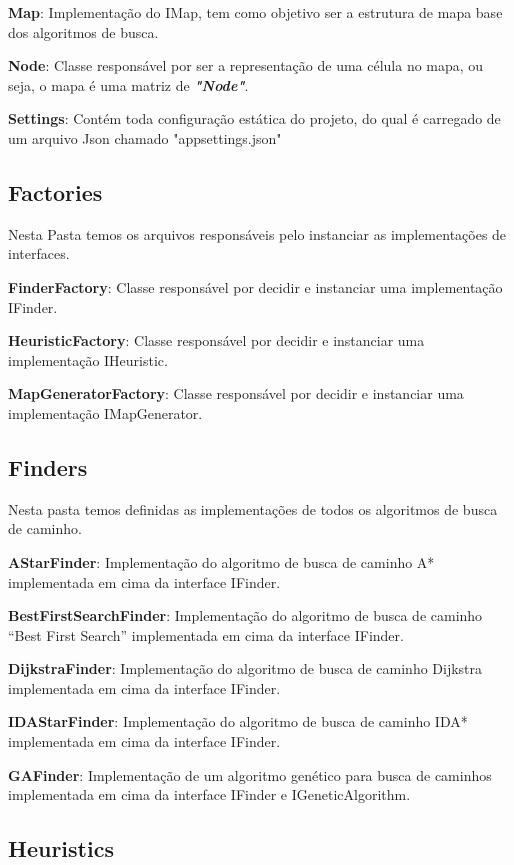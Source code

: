 \textbf{Map}: Implementação do IMap, tem como objetivo ser a estrutura de mapa base dos algoritmos de busca.

\textbf{Node}: Classe responsável por ser a representação de uma célula no mapa, ou seja, o mapa é uma matriz de \textbf{\textit{"Node"}}.

\textbf{Settings}: Contém toda configuração estática do projeto, do qual é carregado de um arquivo Json chamado "appsettings.json"

\subsection{Factories}

Nesta Pasta temos os arquivos responsáveis pelo instanciar as implementações de interfaces.

\textbf{FinderFactory}: Classe responsável por decidir e instanciar uma implementação IFinder.

\textbf{HeuristicFactory}: Classe responsável por decidir e instanciar uma implementação IHeuristic.

\textbf{MapGeneratorFactory}: Classe responsável por decidir e instanciar uma implementação IMapGenerator.

\subsection{Finders}

Nesta pasta temos definidas as implementações de todos os algoritmos de busca de caminho.

\textbf{AStarFinder}: Implementação do algoritmo de busca de caminho A* implementada em cima da interface IFinder.

\textbf{BestFirstSearchFinder}: Implementação do algoritmo de busca de caminho “Best First Search” implementada em cima da interface IFinder.

\textbf{DijkstraFinder}: Implementação do algoritmo de busca de caminho Dijkstra implementada em cima da interface IFinder.

\textbf{IDAStarFinder}: Implementação do algoritmo de busca de caminho IDA* implementada em cima da interface IFinder.

\textbf{GAFinder}: Implementação de um algoritmo genético para busca de caminhos implementada em cima da interface IFinder e IGeneticAlgorithm.

\subsection{Heuristics}

